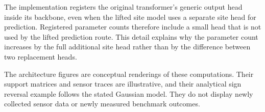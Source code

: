 The implementation registers the original transformer's generic output head inside its backbone, even when the lifted site model uses a separate site head for prediction. Registered parameter counts therefore include a small head that is not used by the lifted prediction route. This detail explains why the parameter count increases by the full additional site head rather than by the difference between two replacement heads.

The architecture figures are conceptual renderings of these computations. Their support matrices and sensor traces are illustrative, and their analytical sign reversal example follows the stated Gaussian model. They do not display newly collected sensor data or newly measured benchmark outcomes.
